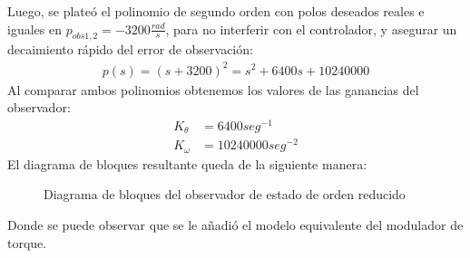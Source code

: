 \documentclass[a4paper, 10pt, onecolumn,journal]{ieeeconf}
\begin{document}
Luego, se plateó el polinomio de segundo orden con polos deseados reales e iguales en $p_{obs1,2} = -3200 \frac{rad}{s}$, para no interferir con el controlador, y asegurar un decaimiento rápido del error de observación:
\begin{align}
	p(s) = \left( s + 3200\right) ^2 = s^2 + 6400 s + 10240000\label{polinomeo caracteristico de observador deseado}
\end{align}
Al comparar ambos polinomios obtenemos los valores de las ganancias del observador:
\begin{align}
	K_{\theta} &= 6400 seg^{-1}\label{ganacia de posicion de observador}\\
	K_{\omega} &= 10240000 seg^{-2}\label{ganacia de velocidad de observador}
\end{align}
El diagrama de bloques resultante queda de la siguiente manera:
\begin{figure}[H]
	\centering
	\begin{adjustbox}{max width=\columnwidth,scale=0.8}
	\end{adjustbox}
	\caption{Diagrama de bloques del observador de estado de orden reducido}
	\label{Diagrama de bloques del observador de estado de orden reducido}
\end{figure}
Donde se puede observar que se le añadió el modelo equivalente del modulador de torque.
\end{document}

